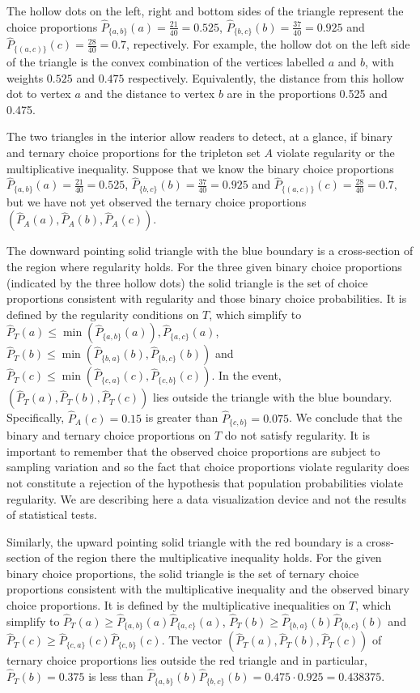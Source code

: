 \documentclass[11pt,letter]{article}
\begin{document}
The hollow dots on the left, right and bottom sides of the triangle represent the choice proportions $\hat P_{\{a,b\}}(a) = \tfrac{21}{40} = 0.525$, $\hat P_{\{b,c\}}(b) = \tfrac{37}{40} = 0.925$ and $\hat P_{\{(a,c)\}}(c) = \tfrac{28}{40} = 0.7$, repectively.
For example, the hollow dot on the left side of the triangle is the convex combination of the vertices labelled $a$ and $b$, with weights $0.525$ and $0.475$ respectively.
Equivalently, the distance from this hollow dot to vertex $a$ and the distance to vertex $b$ are in the proportions 0.525 and 0.475.

The two triangles in the interior allow readers to detect, at a glance, if binary and ternary choice proportions for the tripleton set $A$ violate regularity or the  multiplicative inequality.
Suppose that we know the binary choice proportions $\hat P_{\{a,b\}}(a) = \tfrac{21}{40} = 0.525$, $\hat P_{\{b,c\}}(b) = \tfrac{37}{40} = 0.925$ and $\hat P_{\{(a,c)\}}(c) = \tfrac{28}{40} = 0.7$, but we have not yet observed the ternary choice proportions $(\hat P_A(a), \hat P_A(b), \hat P_A(c))$.

The downward pointing solid triangle with the blue boundary is a cross-section of the region where regularity holds.
For the three given binary choice proportions (indicated by the three hollow dots) the solid triangle is the set of choice proportions consistent with regularity and those binary choice probabilities.
It is defined by the regularity conditions on $T$, which simplify to $\hat P_T(a) \leq \min(\hat P_{\{a,b\}}(a)), \hat P_{\{a,c\}}(a)$, $\hat P_T(b) \leq \min(\hat P_{\{b,a\}}(b), \hat P_{\{b,c\}}(b))$ and $\hat P_T(c) \leq \min(\hat P_{\{c,a\}}(c), \hat P_{\{c,b\}}(c))$.
In the event, $(\hat P_T(a), \hat P_T(b), \hat P_T(c))$ lies outside the triangle with the blue boundary.
Specifically, $\hat P_A(c) = 0.15$ is greater than $\hat P_{\{c,b\}} = 0.075$.
We conclude that the binary and ternary choice proportions on $T$ do not satisfy regularity.
It is important to remember that the observed choice proportions are subject to sampling variation and so the fact that choice proportions violate regularity does not constitute a rejection of the hypothesis that population probabilities violate regularity.
We are describing here a data visualization device and not the results of statistical tests.

Similarly, the upward pointing solid triangle with the red boundary is a cross-section of the region there the multiplicative inequality holds.
For the given binary choice proportions, the solid triangle is the set of ternary choice proportions consistent with the multiplicative inequality and the observed  binary choice proportions.
It is defined by the multiplicative inequalities on $T$, which simplify to $\hat P_T(a) \geq \hat P_{\{a,b\}}(a) \hat P_{\{a,c\}}(a)$, $\hat P_T(b) \geq \hat P_{\{b,a\}}(b) \hat P_{\{b,c\}}(b)$ and $\hat P_T(c) \geq \hat P_{\{c,a\}}(c) \hat P_{\{c,b\}}(c)$.
The vector $(\hat P_T(a), \hat P_T(b), \hat P_T(c))$ of ternary choice proportions lies outside the red triangle and in particular, $\hat P_T(b) = 0.375$ is less than $\hat P_{\{a,b\}}(b) \hat P_{\{b,c\}}(b) = 0.475 \cdot 0.925 = 0.438375$.
\end{document}
